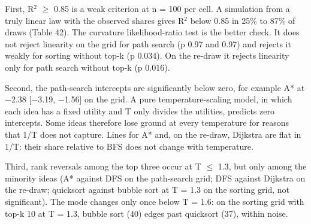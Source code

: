 \documentclass[11pt,letterpaper]{article}
\begin{document}
First, R\ensuremath{^2} \ensuremath{\geq} 0.85 is a weak criterion at n = 100 per cell. A simulation from a truly linear law with the observed shares gives R\ensuremath{^2} below 0.85 in 25\% to 87\% of draws (Table 42). The curvature likelihood-ratio test is the better check. It does not reject linearity on the grid for path search (p 0.97 and 0.97) and rejects it weakly for sorting without top-k (p 0.034). On the re-draw it rejects linearity only for path search without top-k (p 0.016).

Second, the path-search intercepts are significantly below zero, for example A* at \ensuremath{-}2.38 [\ensuremath{-}3.19, \ensuremath{-}1.56] on the grid. A pure temperature-scaling model, in which each idea has a fixed utility and T only divides the utilities, predicts zero intercepts. Some ideas therefore lose ground at every temperature for reasons that 1/T does not capture. Lines for A* and, on the re-draw, Dijkstra are flat in 1/T: their share relative to BFS does not change with temperature.

Third, rank reversals among the top three occur at T \ensuremath{\leq} 1.3, but only among the minority ideas (A* against DFS on the path-search grid; DFS against Dijkstra on the re-draw; quicksort against bubble sort at T = 1.3 on the sorting grid, not significant). The mode changes only once below T = 1.6: on the sorting grid with top-k 10 at T = 1.3, bubble sort (40) edges past quicksort (37), within noise.
\end{document}
